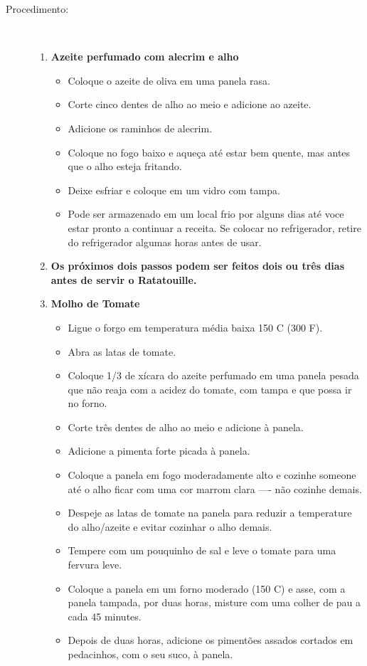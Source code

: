 \documentclass [11pt, letterpaper] {article}
\begin{document}
\begin{description}
\item[Procedimento:]\ \\
	\begin{enumerate}
	\item {\bf Azeite perfumado com alecrim e alho} 
	\begin{itemize}
	\item Coloque o azeite de oliva em uma panela rasa.
	\item Corte cinco dentes de alho ao meio e adicione ao azeite.
	\item Adicione os raminhos de alecrim.
	\item Coloque no fogo baixo e aque\c{c}a at\'e estar bem quente, mas antes que o alho esteja fritando.
	\item Deixe esfriar e coloque em um vidro com tampa.
	\item Pode ser armazenado em um local frio por alguns dias at\'e voce estar pronto a continuar a receita. Se colocar no refrigerador, retire do refrigerador algumas horas antes de usar.
	\end{itemize}
	\item {\bf Os pr\'oximos dois passos podem ser feitos dois ou tr\^es dias antes de servir o Ratatouille. }
	\item {\bf Molho de Tomate}
	\begin{itemize}
	\item Ligue o forgo em temperatura m\'edia baixa 150 C (300 F).
	\item Abra as latas de tomate.
	\item Coloque 1/3 de x\'{i}cara do azeite perfumado em uma panela pesada que n\~ao reaja com a acidez do tomate, com tampa e que possa ir no forno.
	\item Corte tr\^es dentes de alho ao meio e adicione \`a panela.
	\item Adicione a pimenta forte picada \`a panela.
	\item Coloque a panela em fogo moderadamente alto e cozinhe someone at\'e o alho ficar com uma cor marrom clara ---- n\~ao cozinhe demais.
	\item Despeje as latas de tomate na panela para reduzir a temperature do alho/azeite e evitar cozinhar o alho demais.
	\item Tempere com um pouquinho de sal e leve o tomate para uma fervura leve.
	\item Coloque a panela em um forno moderado (150 C) e asse, com a panela tampada, por duas horas, misture com uma colher de pau a cada 45 minutes.
	\item Depois de duas horas, adicione os piment\~oes assados cortados em pedacinhos, com o seu suco, \`a panela.

\end{itemize}
\end{enumerate}
\end{description}
\end{document}
